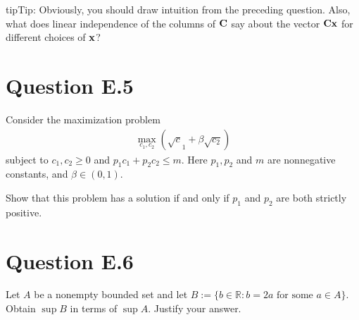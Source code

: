 \documentclass[letterpaper,10pt,english]{jupyterBook}
\begin{document}
\begin{sphinxadmonition}{tip}{Tip:}
\sphinxAtStartPar
Obviously, you should
draw intuition from the preceding question. Also, what does linear
independence of the columns of \({\bf C}\) say about the vector \({\bf C}
{\bf x}\) for different choices of \({\bf x}\)?
\end{sphinxadmonition}


\section{Question E.5}
\label{\detokenize{06.exercises.E:question-e-5}}
\sphinxAtStartPar
Consider the maximization problem
\begin{equation*}
\begin{split}
%
\max_{c_1, c_2} ( \sqrt c_1 + \beta \sqrt{c_2})
%
\end{split}
\end{equation*}
\sphinxAtStartPar
subject to \(c_1, c_2 \geq 0\) and \(p_1 c_1 + p_2 c_2 \leq m\).
Here \(p_1, p_2\) and \(m\) are nonnegative constants, and \(\beta \in (0, 1)\).

\sphinxAtStartPar
Show that this problem has a solution if and only if \(p_1\) and \(p_2\) are both
strictly positive.


\section{Question E.6}
\label{\detokenize{06.exercises.E:question-e-6}}
\sphinxAtStartPar
Let \(A\) be a nonempty bounded set and let \(B := \{ b \in \mathbb{R} \colon b = 2a \text{ for some } a \in A\}\).
Obtain \(\sup B\) in terms of \(\sup A\). Justify your answer.







\renewcommand{\indexname}{Index}
\printindex
\end{document}
